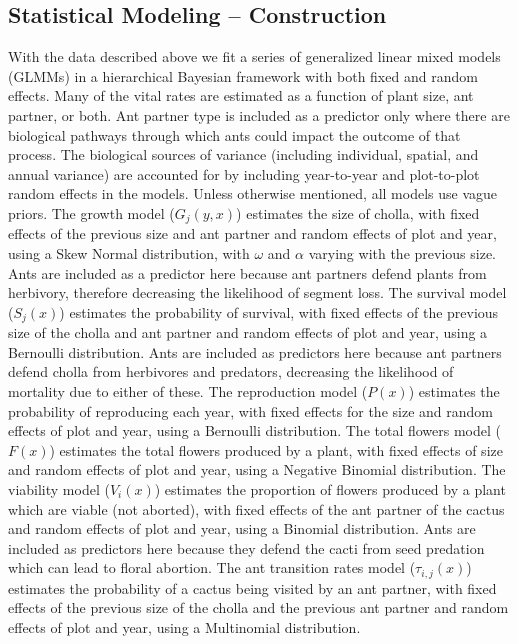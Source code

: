 \documentclass[11pt]{article}\usepackage[sc]{mathpazo} %
\begin{document}
	\subsection*{Statistical Modeling -- Construction}
  With the data described above we fit a series of generalized linear mixed models (GLMMs) in a hierarchical Bayesian framework with both fixed and random effects.
Many of the vital rates are estimated as a function of plant size, ant partner, or both.
Ant partner type is included as a predictor only where there are biological pathways through which ants could impact the outcome of that process. 
The biological sources of variance (including individual, spatial, and annual variance) are accounted for by including year-to-year and plot-to-plot random effects in the models. 
Unless otherwise mentioned, all models use vague priors. 
The growth model ($G_j(y,x)$) estimates the size of cholla, with fixed effects of the previous size and ant partner and random effects of plot and year, using a Skew Normal distribution, with $\omega$ and $\alpha$ varying with the previous size. 
Ants are included as a predictor here because ant partners defend plants from herbivory, therefore decreasing the likelihood of segment loss.
The survival model ($S_j(x)$) estimates the probability of survival, with fixed effects of the previous size of the cholla and ant partner and random effects of plot and year, using a Bernoulli distribution. 
Ants are included as predictors here because ant partners defend cholla from herbivores and predators, decreasing the likelihood of mortality due to either of these. 
The reproduction model ($P(x)$) estimates the probability of reproducing each year, with fixed effects for the size and random effects of plot and year, using a Bernoulli distribution. 
The total flowers model ($F(x)$) estimates the total flowers produced by a plant, with fixed effects of size and random effects of plot and year, using a Negative Binomial distribution. 
The viability model ($V_i(x)$) estimates the proportion of flowers produced by a plant which are viable (not aborted), with fixed effects of the ant partner of the cactus and random effects of plot and year, using a Binomial distribution.
Ants are included as predictors here because they defend the cacti from seed predation which can lead to floral abortion. 
The ant transition rates model ($\tau_{i,j}(x)$) estimates the probability of a cactus being visited by an ant partner, with fixed effects of the previous size of the cholla and the previous ant partner and random effects of plot and year, using a Multinomial distribution.  
\end{document}
